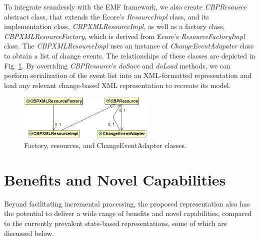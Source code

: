 \documentclass{llncs}
\begin{document}
To integrate seamlessly with the EMF framework, we also create \emph{CBPResource} abstract class, that extends the Ecore's \emph{ResourceImpl} class, and its implementation class, \emph{CBPXMLResourceImpl}, as well as a factory class,  \emph{CBPXMLResourceFactory}, which is derived from Ecore's \emph{ResourceFactoryImpl} class. The \emph{CBPXMLResourceImpl} uses an instance of \emph{ChangeEventAdapater} class to obtain a list of change events. The relationships of these classes are depicted in Fig. \ref{resources}. By overriding \emph{CBPResource}'s \emph{doSave} and  \emph{doLoad} methods, we can perform serialization of the event list into an XML-formatted representation and load any relevant change-based XML representation to recreate its model.

\begin{figure}[th]
\centering
\includegraphics[width=6.5cm]{resources}
\caption{Factory, resources, and ChangeEventAdapter classes.}
\label{resources}
\end{figure}

\section{Benefits and Novel Capabilities}
\label{Benefits and Novel Capabilities}
Beyond facilitating incremental processing, the proposed representation also has the potential to deliver a wide range of benefits and novel capabilities, compared to the currently prevalent state-based representations, some of which are discussed below.
\end{document}
